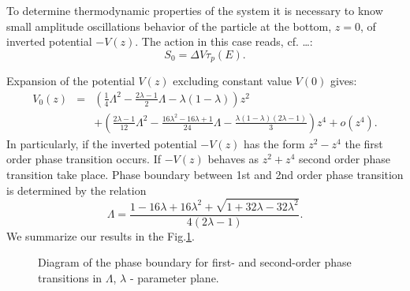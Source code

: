 \documentclass[aps, pre, preprint, groupedaddress, superscriptaddress, showkeys, showpacs] {revtex4-1}
\begin{document}
To determine thermodynamic properties of the system it is necessary to know small amplitude oscillations behavior of the particle at the bottom, $z=0$, of inverted potential $-V(z)$.
The action in this case reads, {\red cf. \dots}:
%
\begin{equation}
S_0 = \Delta V \tau_p (E).
\label{eq:thermal_action}
\end{equation}
%

Expansion of the potential $V(z)$ excluding constant value $V(0)$ gives:
%
\begin{equation}
\begin{array}{lcl}
V_0(z) & = &\left( \frac{1}{4} \Lambda^2  - \frac{2\lambda - 1}{2} \Lambda - \lambda (1 - \lambda) \right) z^2 \\
&& + \left( \frac{2\lambda - 1}{12} \Lambda^2 - \frac{16\lambda^2 - 16\lambda + 1}{24} \Lambda - \frac{\lambda (1 - \lambda) (2\lambda - 1)}{3} \right) z^4 + o(z^4).
\end{array}
\label{eq:potential_teylor}
\end{equation}
%
In particularly, if the inverted potential $-V(z)$ has the form $z^2 - z^4$ the first order phase transition occurs.
If $-V(z)$ behaves as $z^2 + z^4$ second order phase transition take place.
Phase boundary between 1st and 2nd order phase transition is determined by the relation
%
\begin{equation}
\Lambda = \frac{1 - 16\lambda + 16\lambda^2 + \sqrt{1 + 32\lambda - 32\lambda^2}}{4(2\lambda - 1)}.
\label{eq:order_border}
\end{equation}
%
We summarize our results in the Fig.\ref{pic:phase_boundary}. 
%
\begin{figure}[ht]
\caption{Diagram of the phase boundary for  first- and second-order  phase transitions in $\Lambda$, $\lambda$ - parameter plane. \label{pic:phase_boundary}}
\end{figure}
%
\end{document}
